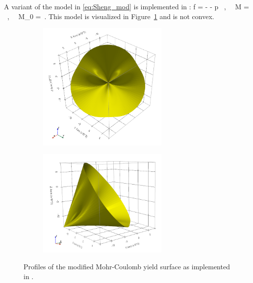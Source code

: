 A variant of the model in \eqref{eq:Sheng_mod} is implemented in \Vaango:
\Beq
  f =  -  - p ~,~~
  M =  ~,~~
  M_0 =  \,.
\Eeq
This model is visualized in Figure~\ref{fig:MC_Sheng_imp} and is not convex.
\begin{figure}[htbp!]
  \begin{subfigure}[t]{0.5\textwidth}
    \centering
    \includegraphics[width=0.7\textwidth]{Figs/mohr_coulomb/MC_sheng_octahedral_imp.png}
  \end{subfigure}
  \begin{subfigure}[t]{0.5\textwidth}
    \centering
    \includegraphics[width=0.7\textwidth]{Figs/mohr_coulomb/MC_sheng_3D_imp.png}
  \end{subfigure}
  \caption{Profiles of the modified Mohr-Coulomb yield surface as implemented in \Vaango.}
  \label{fig:MC_Sheng_imp}
\end{figure}

